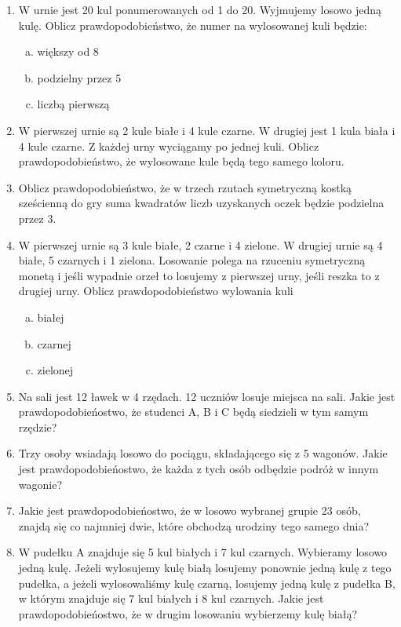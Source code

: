 \documentclass[12pt,a4paper]{article}
\begin{document}
\begin{enumerate}[1.]
	\item W urnie jest 20 kul ponumerowanych od 1 do 20. Wyjmujemy losowo jedną kulę. Oblicz prawdopodobieństwo, że numer na wylosowanej kuli będzie:
	\begin{enumerate}[a)]
		\item większy od 8
		\item podzielny przez 5
		\item liczbą pierwszą
	\end{enumerate}
	\item W pierwszej urnie są 2 kule białe i 4 kule czarne. W drugiej jest 1 kula biała i 4 kule czarne. Z każdej urny wyciągamy po jednej kuli. Oblicz prawdopodobieństwo, że wylosowane kule będą tego samego koloru.
	\item Oblicz prawdopodobieństwo, że w trzech rzutach symetryczną kostką sześcienną do gry suma kwadratów liczb uzyskanych oczek będzie podzielna przez 3.
	\item W pierwszej urnie są 3 kule białe, 2 czarne i 4 zielone. W drugiej urnie są 4 białe, 5 czarnych i 1 zielona. Losowanie polega na rzuceniu symetryczną monetą i jeśli wypadnie orzeł to losujemy z pierwszej urny, jeśli reszka to z drugiej urny. Oblicz prawdopodobieństwo wylowania kuli
	\begin{enumerate}[a)]
		\item białej
		\item czarnej
		\item zielonej
	\end{enumerate}
	
	\item Na sali jest 12 ławek w 4 rzędach. 12 uczniów losuje miejsca na sali. Jakie jest prawdopodobieńostwo, że studenci A, B i C będą siedzieli w tym samym rzędzie?
	
	\item Trzy osoby wsiadają losowo do pociągu, składającego się z 5 wagonów. Jakie jest prawdopodobieńostwo, że każda z tych osób odbędzie podróż w innym wagonie?
	
	\item Jakie jest prawdopodobieńostwo, że w losowo wybranej grupie 23 osób, znajdą się co najmniej dwie, które obchodzą urodziny tego samego dnia?
	
	\item W pudełku A znajduje się 5 kul białych i 7 kul czarnych. Wybieramy losowo jedną kulę. Jeżeli wylosujemy kulę białą losujemy ponownie jedną kulę z tego pudełka, a jeżeli wylosowaliśmy kulę czarną, losujemy jedną kulę z pudełka B, w którym znajduje się 7 kul białych i 8 kul czarnych. Jakie jest prawdopodobieńostwo, że w drugim losowaniu wybierzemy kulę białą?
	

\end{enumerate}
\end{document}
